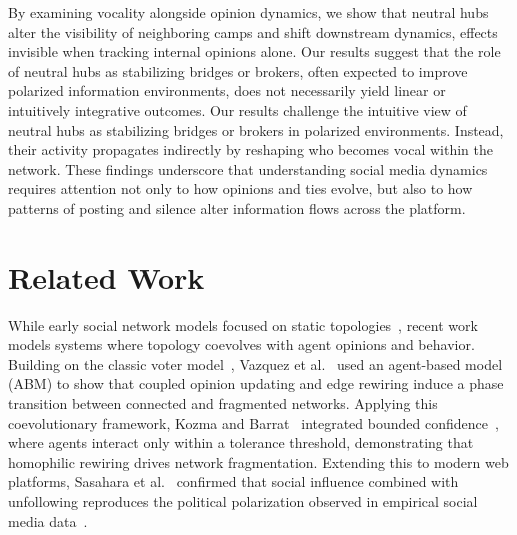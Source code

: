 \documentclass{svproc}
\begin{document}
By examining vocality alongside opinion dynamics, we show that
neutral hubs alter the visibility of neighboring camps and shift
downstream dynamics, effects invisible when tracking internal opinions
alone.
Our results suggest that the role of neutral hubs as stabilizing
bridges or brokers, often expected to improve polarized information
environments, does not necessarily yield linear or intuitively
integrative outcomes. Our results challenge the intuitive view of
neutral hubs as stabilizing bridges or brokers in polarized
environments. Instead, their activity propagates indirectly by
reshaping who becomes vocal within the network. These findings
underscore that understanding social media dynamics requires attention
not only to how opinions and ties evolve, but also to how patterns of
posting and silence alter information flows across the platform.
\par

\section{Related Work}\label{sec:related}
While early social network models focused on static
topologies~\cite{watts1998}, recent work models systems where topology
coevolves with agent opinions and behavior. Building on the classic
voter model~\cite{clifford1973}, Vazquez et al.~\cite{vazquez2008}
used an agent-based model (ABM) to show that coupled opinion updating
and edge rewiring induce a phase transition between connected and
fragmented networks. Applying this coevolutionary framework, Kozma and
Barrat~\cite{kozma2008} integrated bounded
confidence~\cite{deffuant2000,hegselmann2002}, where agents interact
only within a tolerance threshold, demonstrating that homophilic
rewiring drives network fragmentation. Extending this to modern
web platforms, Sasahara et al.~\cite{sasahara2020} confirmed that
social influence combined with unfollowing reproduces the political
polarization observed in empirical social media
data~\cite{conover2011}.
\par
\end{document}
